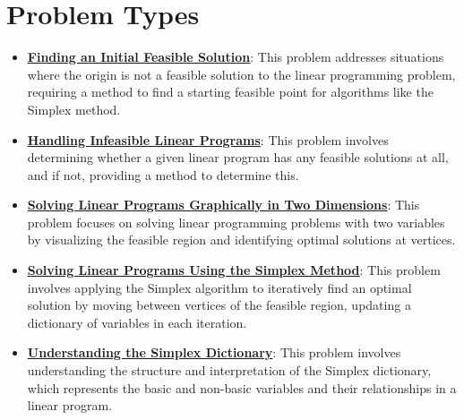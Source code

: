 \documentclass{article}%
\begin{document}
%
\section{Problem Types}%
\label{sec:ProblemTypes}%
\begin{itemize}[leftmargin=*]%
\item \href{https://www.math.purdue.edu/~yipn/421/2024-08-27-ExSimplex.pdf#page=30}{\textbf{Finding an Initial Feasible Solution}}: This problem addresses situations where the origin is not a feasible solution to the linear programming problem, requiring a method to find a starting feasible point for algorithms like the Simplex method.%
\item \href{https://www.math.purdue.edu/~yipn/421/2024-08-27-ExSimplex.pdf#page=30}{\textbf{Handling Infeasible Linear Programs}}: This problem involves determining whether a given linear program has any feasible solutions at all, and if not, providing a method to determine this.%
\item \href{https://www.math.purdue.edu/~yipn/421/2024-08-27-ExSimplex.pdf#page=2}{\textbf{Solving Linear Programs Graphically in Two Dimensions}}: This problem focuses on solving linear programming problems with two variables by visualizing the feasible region and identifying optimal solutions at vertices.%
\item \href{https://www.math.purdue.edu/~yipn/421/2024-08-27-ExSimplex.pdf#page=6}{\textbf{Solving Linear Programs Using the Simplex Method}}: This problem involves applying the Simplex algorithm to iteratively find an optimal solution by moving between vertices of the feasible region, updating a dictionary of variables in each iteration.%
\item \href{https://www.math.purdue.edu/~yipn/421/2024-08-27-ExSimplex.pdf#page=26}{\textbf{Understanding the Simplex Dictionary}}: This problem involves understanding the structure and interpretation of the Simplex dictionary, which represents the basic and non-basic variables and their relationships in a linear program.%
\end{itemize}

%
\end{document}
